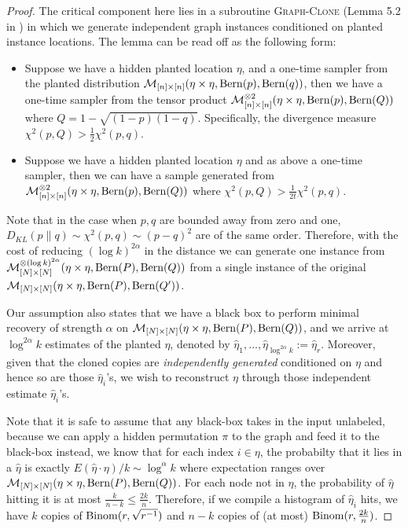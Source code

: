 \documentclass[final,12pt]{colt2023} %
\newcommand\1[1]{\mathbb{I}_{\left\{#1\right\}}}
\begin{document}
\begin{proof}
The critical component here lies in a subroutine \textsc{Graph-Clone} (Lemma 5.2 in \cite{BBH19}) in which we generate independent graph instances conditioned on planted instance locations. The lemma can be read off as the following form:\begin{itemize}
    \item Suppose we have a hidden planted location $\eta$, and a one-time sampler from the planted distribution $\mathcal{M}_{[n]\times [n]}(\eta\times \eta, {\rm Bern}(p), {\rm Bern}(q))$, then we have a one-time sampler from the tensor product $\mathcal{M}_{[n]\times [n]}^{\otimes 2}(\eta\times \eta, {\rm Bern}(p), {\rm Bern}(Q))$ where $Q=1-\sqrt{(1-p)(1-q)}$. Specifically, the divergence measure $\chi^2(p, Q)>\frac{1}{2}\chi^2(p, q)$.
    \item[Corollary:] Suppose we have a hidden planted location $\eta$ and as above a one-time sampler, then we can have a sample generated from $\mathcal{M}_{[n]\times [n]}^{\otimes 2}(\eta\times \eta, {\rm Bern}(p), {\rm Bern}(Q))$ where $\chi^2(p, Q)>\frac{1}{2t}\chi^2(p, q)$.
\end{itemize}
Note that in the case when $p, q$ are bounded away from zero and one, $D_{KL}(p\|q)\sim \chi^2(p, q)\sim (p-q)^2$ are of the same order. Therefore, with the cost of reducing $(\log k)^{2\alpha}$ in the distance we can generate one instance from $\mathcal{M}^{\otimes (\log k)^{2\alpha}}_{[N]\times [N]}(\eta\times \eta, {\rm Bern}(P), {\rm Bern}(Q))$ from a single instance of the original $\mathcal{M}_{[N]\times [N]}(\eta\times \eta, {\rm Bern}(P), {\rm Bern}(Q'))$.

\spac Our assumption also states that we have a black box to perform minimal recovery of strength $\alpha$ on $\mathcal{M}_{[N]\times [N]}(\eta\times \eta, {\rm Bern}(P), {\rm Bern}(Q))$, and we arrive at $\log^{2\alpha} k$ estimates of the planted $\eta$, denoted by $\hat\eta_1,\dots, \hat\eta_{\log^{2\alpha}k}:=\hat\eta_{r}$. Moreover, given that the cloned copies are \emph{independently generated} conditioned on $\eta$ and hence so are those $\hat\eta_i$'s, we wish to reconstruct $\eta$ through those independent estimate $\hat\eta_i$'s.

\spac Note that it is safe to assume that any black-box takes in the input unlabeled, because we can apply a hidden permutation $\pi$ to the graph and feed it to the black-box instead, we know that for each index $i\in \eta$, the probabilty that it lies in a $\hat \eta$ is exactly $E(\hat \eta\cdot \eta)/k\sim \log^{\alpha} k$ where expectation ranges over $\mathcal{M}_{[N]\times [N]}(\eta\times \eta, {\rm Bern}(P), {\rm Bern}(Q))$. For each node not in $\eta$, the probability of $\hat \eta$ hitting it is at most $\frac{k}{n-k}\leq \frac{2k}{n}$. Therefore, if we compile a histogram of $\hat \eta_i$ hits, we have $k$ copies of ${\rm Binom}(r, \sqrt{r^{-1}})$ and $n-k$ copies of (at most) ${\rm Binom}(r, \frac{2k}{n})$.


\end{proof}
\end{document}
